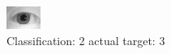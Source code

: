 \begin{figure}[h!]
\begin{center}
\includegraphics[width=0.60\columnwidth]{figures/ID1113_class_2_target_3.png}
\end{center}
\caption{ Classification: 2 actual target: 3}
\label{fig:ID1113_class_2_target_3}
\end{figure}
